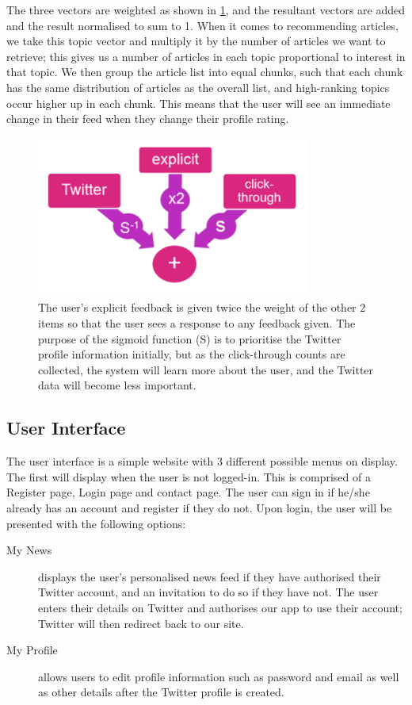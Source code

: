 \documentclass[11pt]{article}
\begin{document}
The three vectors are weighted as shown in \cref{recommend}, and the resultant vectors are added and the result normalised to sum to 1. When it comes to recommending articles, we take this topic vector and multiply it by the number of articles we want to retrieve; this gives us a number of articles in each topic proportional to interest in that topic. We then group the article list into equal chunks, such that each chunk has the same distribution of articles as the overall list, and high-ranking topics occur higher up in each chunk. This means that the user will see an immediate change in their feed when they change their profile rating.

\begin{figure}[h]
\centering
\includegraphics[width=0.8\textwidth]{./IMG/recommend_algo.png}
\caption{The user's explicit feedback is given twice the weight of the other 2 items so that the user sees a response to any feedback given. The purpose of the sigmoid function (S) is to prioritise the Twitter profile information initially, but as the click-through counts are collected, the system will learn more about the user, and the Twitter data will become less important.}
\label{recommend}
\end{figure}

\subsection{User Interface}
The user interface is a simple website with 3 different possible menus on display. The first will display when the user is not logged-in. This is comprised of a Register page, Login page and contact page. The user can sign in if he/she already has an account and register if they do not. Upon login, the user will be presented with the following options:
\begin{description}
\item[My News] displays the user's personalised news feed if they have authorised their Twitter account, and an invitation to do so if they have not. The user enters their details on Twitter and authorises our app to use their account; Twitter will then redirect back to our site.
\item[My Profile] allows users to edit profile information such as password and email as well as other details after the Twitter profile is created.
\end{description}
\end{document}
